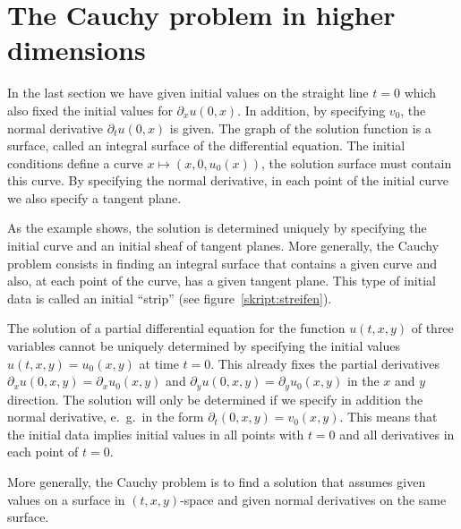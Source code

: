 %
%
%
\section{The Cauchy problem in higher dimensions}
In the last section we have given initial values on the straight line
$t=0$ which also fixed the initial values for $\partial_x u(0,x)$.
In addition, by specifying $v_0$, the normal derivative 
$\partial_t u(0,x)$ is given.
The graph of the solution function is a surface, called an integral
surface of the differential equation.
The initial conditions define a curve $x\mapsto(x,0,u_0(x))$,
the solution surface must contain this curve.
By specifying the normal derivative, in each point of the initial
curve we also specify a tangent plane.

As the example shows, the solution is determined uniquely by specifying
the initial curve and an initial sheaf of tangent planes.
More generally, the Cauchy problem consists in finding an integral
surface that contains a given curve and also, at each point of the curve,
has a given tangent plane.
This type of initial data is called an initial ``strip''
(see figure~\ref{skript:streifen}).

The solution of a partial differential equation for the function $u(t,x,y)$
of three variables cannot be uniquely determined by specifying
the initial values $u(t,x,y)=u_0(x,y)$ at time $t=0$.
This already fixes the partial derivatives
$\partial_x u(0,x,y)=\partial_xu_0(x,y)$
and $\partial_y u(0,x,y)=\partial_y u_0(x,y)$
in the $x$ and $y$ direction.
The solution will only be determined if we specify in addition the normal
derivative, e.~g.~in the form
$\partial_t(0,x,y)=v_0(x,y)$.
This means that the initial data implies initial values in all points
with $t=0$ 
and all derivatives in each point of $t=0$.

More generally, the Cauchy problem is to find a solution that assumes
given values on a surface in $(t,x,y)$-space and 
given normal derivatives on the same surface.

